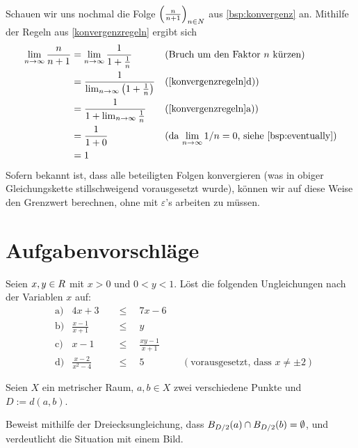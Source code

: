 \begin{bsp}
    Schauen wir uns nochmal die Folge $\left(\frac{n}{n+1}\right)_{n\in \relax N}$ aus \cref{bsp:konvergenz} an. Mithilfe der Regeln aus \cref{konvergenzregeln} ergibt sich
    \begin{align*}
        \lim_{n\to\infty} \frac{n}{n+1} & = \lim_{n\to\infty} \frac{1}{1+\frac{1}{n}} && (\text{Bruch um den Faktor $n$ kürzen}) \\
        & = \frac{1}{\lim_{n\to\infty} \left(1+\frac{1}{n}\right)} && (\text{\cref{konvergenzregeln}d)}) \\
        & = \frac{1}{1+\lim_{n\to\infty} \frac{1}{n}} && (\text{\cref{konvergenzregeln}a)}) \\
        & = \frac{1}{1+0} && (\text{da $\lim_{n\to\infty} 1/n=0$, siehe \cref{bsp:eventually}}) \\
        & = 1
    \end{align*}
    Sofern bekannt ist, dass alle beteiligten Folgen konvergieren (was in obiger Gleichungskette stillschweigend vorausgesetzt wurde), können wir auf diese Weise den Grenzwert berechnen, ohne mit $\varepsilon$'s arbeiten zu müssen.
\end{bsp}





\clearpage
\section{Aufgabenvorschläge}


\begin{aufg}
    Seien $x,y\in \relax R$ mit $x>0$ und $0<y<1$. Löst die folgenden Ungleichungen nach der Variablen $x$ auf:
    \begin{align*}
        &\text{a)} & 4x + 3 \quad&\le\quad 7x-6 \\[0.5em]
        &\text{b)} & \frac{x-1}{x+1} \quad&\le\quad y \\[0.5em]
        &\text{c)} & x-1 \quad&\le\quad \frac{xy-1}{x+1} \\[0.5em]
        &\text{d)} & \frac{x-2}{x^2-4} \quad&\le\quad 5 && (\text{vorausgesetzt, dass $x\neq \pm 2$})
    \end{align*}
\end{aufg}


\begin{aufg} \label{aufg:hausdorff}
    Seien $X$ ein metrischer Raum, $a,b\in X$ zwei verschiedene Punkte und $D:=d(a,b)$.
    
    Beweist mithilfe der Dreiecksungleichung, dass $\relax B_{D/2}(a)\cap \relax B_{D/2}(b)=\emptyset$, und verdeutlicht die Situation mit einem Bild.
\end{aufg}


